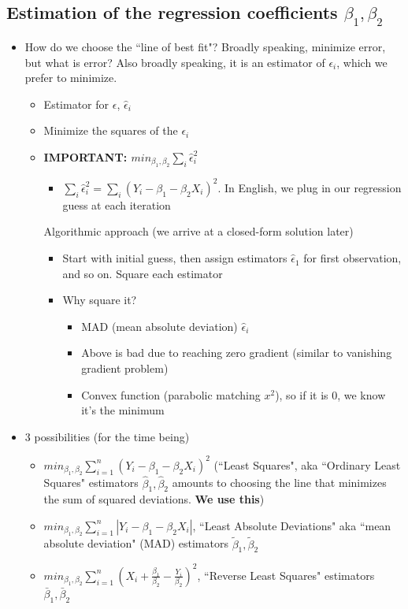 \documentclass[10pt, oneside]{article}
\begin{document}
\subsection{Estimation of the regression coefficients $\beta_1, \beta_2$}
\begin{itemize}
    \item How do we choose the ``line of best fit"? Broadly speaking, minimize error, but what is error? Also broadly speaking, it is an estimator of $\epsilon_i$, which we prefer to minimize.
    \begin{itemize}
        \item Estimator for $\epsilon$, $\hat \epsilon_i$
        \item Minimize the squares of the $\epsilon_i$
        \item \textbf{IMPORTANT: $min_{\beta_1, \beta_2} \sum _{i} \hat \epsilon_i ^2  $}
        \begin{itemize}
            \item $\sum _{i} \hat \epsilon_i ^2 =\sum_i (Y_i -\beta_1 -\beta_2 X_i)^2$. In English, we plug in our regression guess at each iteration
        \end{itemize}
        Algorithmic approach (we arrive at a closed-form solution later)
        \begin{itemize}
            \item Start with initial guess, then assign estimators $\hat \epsilon_1$ for first observation, and so on. Square each estimator
            \item Why square it?
            \begin{itemize}
                \item MAD (mean absolute deviation) $\hat \epsilon_i$
                \item Above is bad due to reaching zero gradient (similar to vanishing gradient problem)
                \item Convex function (parabolic matching $x^2$), so if it is 0, we know it's the minimum
            \end{itemize}
        \end{itemize}
    \end{itemize}
    \item 3 possibilities (for the time being)
    \begin{itemize}
        \item $min_{\beta_1, \beta_2} \sum ^n _{i=1} (Y_i - \beta_1 -\beta_2 X_i)^2$ (``Least Squares", aka ``Ordinary Least Squares" estimators $\hat \beta_1, \hat \beta_2$ amounts to choosing the line that minimizes the sum of squared deviations. \textbf{We use this})
        \item $min_{\beta_1, \beta_2} \sum ^n _{i=1} |Y_i - \beta_1 -\beta_2 X_i|$, ``Least Absolute Deviations" aka ``mean absolute deviation" (MAD) estimators $\tilde \beta_1, \tilde \beta_2$
        \item $min_{\beta_1, \beta_2} \sum ^n _{i=1} (X_i + \frac{\beta_1}{\beta_2} - \frac{Y_i}{\beta_2})^2$, ``Reverse Least Squares" estimators $\bar \beta_1, \bar \beta_2$
    \end{itemize}
\end{itemize}
\end{document}
